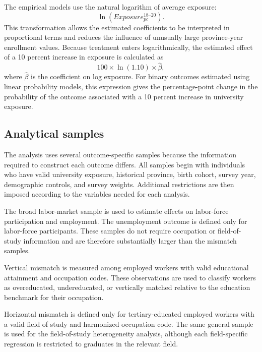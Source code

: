The empirical models use the natural logarithm of average exposure:
\begin{equation}
\ln\left( Exposure_{pc}^{18\text{--}20} \right).
\end{equation}
This transformation allows the estimated coefficients to be interpreted in proportional terms and reduces the influence of unusually large province-year enrollment values. Because treatment enters logarithmically, the estimated effect of a 10 percent increase in exposure is calculated as
\begin{equation}
100 \times \ln(1.10) \times \widehat{\beta},
\end{equation}
where $\widehat{\beta}$ is the coefficient on log exposure. For binary outcomes estimated using linear probability models, this expression gives the percentage-point change in the probability of the outcome associated with a 10 percent increase in university exposure.

\subsection{Analytical samples}
\label{sec:samples}

The analysis uses several outcome-specific samples because the information required to construct each outcome differs. All samples begin with individuals who have valid university exposure, historical province, birth cohort, survey year, demographic controls, and survey weights. Additional restrictions are then imposed according to the variables needed for each analysis.

The broad labor-market sample is used to estimate effects on labor-force participation and employment. The unemployment outcome is defined only for labor-force participants. These samples do not require occupation or field-of-study information and are therefore substantially larger than the mismatch samples.

Vertical mismatch is measured among employed workers with valid educational attainment and occupation codes. These observations are used to classify workers as overeducated, undereducated, or vertically matched relative to the education benchmark for their occupation.

Horizontal mismatch is defined only for tertiary-educated employed workers with a valid field of study and harmonized occupation code. The same general sample is used for the field-of-study heterogeneity analysis, although each field-specific regression is restricted to graduates in the relevant field.

